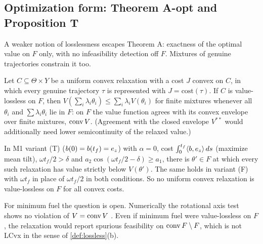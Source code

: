 \subsection{Optimization form: Theorem A-opt and Proposition T}\label{sec:aopt}
A weaker notion of losslessness escapes Theorem A: exactness of the optimal value on $F$ only, with no
infeasibility detection off $F$. Mixtures of genuine trajectories constrain it too.

\begin{theorem}\label{thm:Aopt}
Let $C\subseteq\Theta\times Y$ be a uniform convex relaxation with a cost $J$ convex on $C$, in which every genuine
trajectory $\tau$ is represented with $J=\text{cost}(\tau)$. If $C$ is value-lossless on $F$, then
$V(\sum_i\lambda_i\theta_i)\le\sum_i\lambda_iV(\theta_i)$ for finite mixtures whenever all $\theta_i$ and $\sum\lambda_i\theta_i$ lie in $F$:
on $F$ the value function agrees with its convex envelope over finite mixtures, $\operatorname{conv} V$. (Agreement with the closed envelope
$V^{**}$ would additionally need lower semicontinuity of the relaxed value.)\Srep\ \Slean
\end{theorem}
\begin{proposition}\label{prop:T}
In M1 variant (T) ($b(0)=b(t_f)=e_z$) with $\alpha=0$, cost $\int_0^{t_f}\langle b,e_z\rangle\,ds$ (maximize mean tilt), $\omega t_f/2>\delta$
and $a_2\cos(\omega t_f/2-\delta)\ge a_1$, there is $\theta'\in F$ at which every such relaxation has value strictly below $V(\theta')$.
The same holds in variant (F) with $\omega t_f$ in place of $\omega t_f/2$ in both conditions. So no uniform convex relaxation is
value-lossless on $F$ for all convex costs.\Srep\ 
\end{proposition}
For minimum fuel the question is open. Numerically the rotational axis test shows no violation of $V=\operatorname{conv} V$
. Even if minimum fuel were value-lossless on $F$, the relaxation would report spurious
feasibility on $\operatorname{conv} F\setminus F$, which is not LCvx in the sense of \cref{def:lossless}(b).

